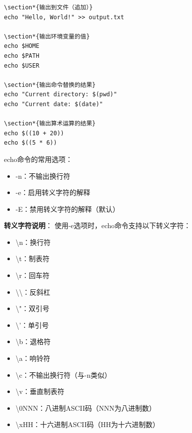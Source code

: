 \documentclass[12pt,UTF8]{ctexbook}
\begin{document}
\begin{verbatim}
\section*{输出到文件（追加）}
echo "Hello, World!" >> output.txt

\section*{输出环境变量的值}
echo $HOME
echo $PATH
echo $USER

\section*{输出命令替换的结果}
echo "Current directory: $(pwd)"
echo "Current date: $(date)"

\section*{输出算术运算的结果}
echo $((10 + 20))
echo $((5 * 6))
\end{verbatim}

echo命令的常用选项：
\begin{itemize}
    \item -n：不输出换行符
    \item -e：启用转义字符的解释
    \item -E：禁用转义字符的解释（默认）
\end{itemize}

\textbf{转义字符说明}：
使用-e选项时，echo命令支持以下转义字符：
\begin{itemize}
    \item \textbackslash n：换行符
    \item \textbackslash t：制表符
    \item \textbackslash r：回车符
    \item \textbackslash \textbackslash：反斜杠
    \item \textbackslash "：双引号
    \item \textbackslash '：单引号
    \item \textbackslash b：退格符
    \item \textbackslash a：响铃符
    \item \textbackslash c：不输出换行符（与-n类似）
    \item \textbackslash v：垂直制表符
    \item \textbackslash 0NNN：八进制ASCII码（NNN为八进制数）
    \item \textbackslash xHH：十六进制ASCII码（HH为十六进制数）
\end{itemize}
\end{document}
